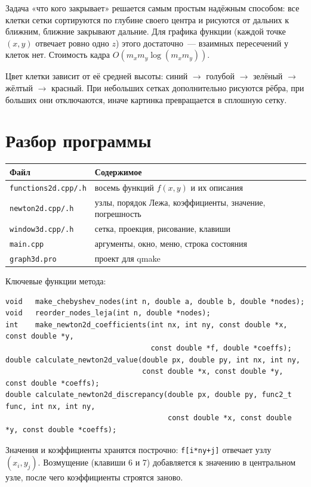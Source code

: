 \documentclass[11pt,a4paper]{report}
\begin{document}
Задача «что кого закрывает» решается самым простым надёжным способом: все
клетки сетки сортируются по глубине своего центра и рисуются от дальних к
ближним, ближние закрывают дальние. Для графика функции (каждой точке $(x,y)$
отвечает ровно одно $z$) этого достаточно~--- взаимных пересечений у клеток
нет. Стоимость кадра $O(m_xm_y\log(m_xm_y))$.

Цвет клетки зависит от её средней высоты: синий $\to$ голубой $\to$ зелёный
$\to$ жёлтый $\to$ красный. При небольших сетках дополнительно рисуются рёбра,
при больших они отключаются, иначе картинка превращается в сплошную сетку.

\section{Разбор программы}

\begin{center}
\begin{tabular}{ll}
\toprule
Файл & Содержимое \\
\midrule
\texttt{functions2d.cpp/.h} & восемь функций $f(x,y)$ и их описания \\
\texttt{newton2d.cpp/.h} & узлы, порядок Лежа, коэффициенты, значение, погрешность \\
\texttt{window3d.cpp/.h} & сетка, проекция, рисование, клавиши \\
\texttt{main.cpp} & аргументы, окно, меню, строка состояния \\
\texttt{graph3d.pro} & проект для qmake \\
\bottomrule
\end{tabular}
\end{center}

Ключевые функции метода:
\begin{lstlisting}[style=cpp]
void   make_chebyshev_nodes(int n, double a, double b, double *nodes);
void   reorder_nodes_leja(int n, double *nodes);
int    make_newton2d_coefficients(int nx, int ny, const double *x, const double *y,
                                  const double *f, double *coeffs);
double calculate_newton2d_value(double px, double py, int nx, int ny,
                                const double *x, const double *y, const double *coeffs);
double calculate_newton2d_discrepancy(double px, double py, func2_t func, int nx, int ny,
                                      const double *x, const double *y, const double *coeffs);
\end{lstlisting}
Значения и коэффициенты хранятся построчно: \texttt{f[i*ny+j]} отвечает узлу
$(x_i,y_j)$. Возмущение (клавиши 6 и 7) добавляется к значению в центральном
узле, после чего коэффициенты строятся заново.
\end{document}
